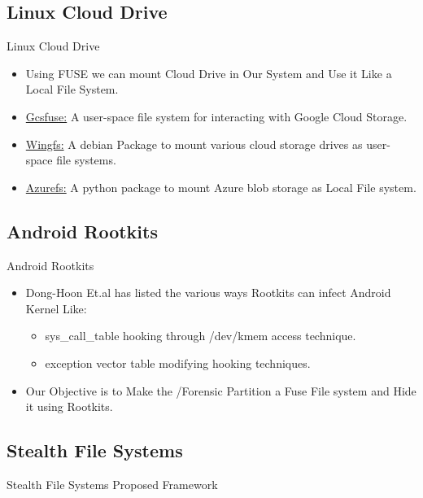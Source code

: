 \documentclass[12pt]{beamer}
\begin{document}
\subsection{Linux Cloud Drive}
\begin{frame}{Linux Cloud Drive}
	\begin{itemize}
	\item{Using FUSE we can mount Cloud Drive in Our System and Use it Like a Local File System.
	}
	\bigskip
	
	 \item \href{https://github.com/GoogleCloudPlatform/gcsfuse}{Gcsfuse:} A user-space file system for interacting with Google Cloud Storage.
	 \bigskip
	 
	 \item \href{http://www.archiware.com/products/wingfs}{Wingfs:} A debian Package to mount various cloud storage drives as user-space file systems.
	 \bigskip 
	 \item \href{https://ahmetalpbalkan.com/blog/introducing-azurefs/}{Azurefs:} A python package to mount Azure blob storage as Local File system.
	 \end{itemize}	   	
\end{frame}
\subsection{Android Rootkits}
\begin{frame}{Android Rootkits}
	\begin{itemize}
	\item Dong-Hoon Et.al \cite{Dong} has listed the various ways Rootkits can infect Android Kernel Like:
	\bigskip
	\begin{itemize}
	\item sys\_call\_table hooking through /dev/kmem access technique.
	\bigskip
	\item exception vector table modifying hooking techniques.
	
	\end{itemize}
	
	\item Our Objective is to Make the /Forensic Partition a Fuse File system and Hide it using Rootkits.
		
	\end{itemize}
\end{frame}

\subsection{Stealth File Systems}
\begin{frame}{Stealth File Systems }{Proposed Framework}

\end{frame}
\end{document}
